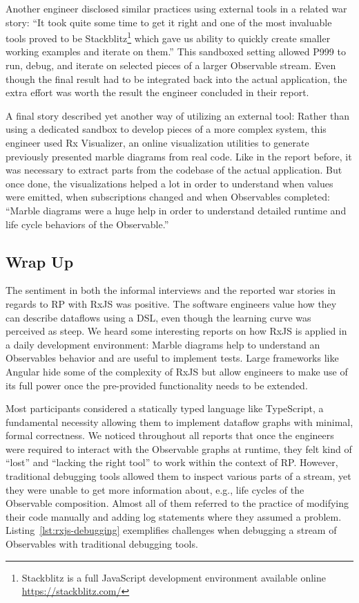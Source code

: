 \documentclass[12pt,a4paper]{article}
\begin{document}
Another engineer disclosed similar practices using external tools in a related war story: ``It took quite some time to get it right and one of the most invaluable tools proved to be Stackblitz\footnote{Stackblitz is a full JavaScript development environment available online \url{https://stackblitz.com/}} which gave us ability to quickly create smaller working examples and iterate on them.'' This sandboxed setting allowed P999 to run, debug, and iterate on selected pieces of a larger Observable stream. Even though the final result had to be integrated back into the actual application, the extra effort was worth the result the engineer concluded in their report.

A final story described yet another way of utilizing an external tool: Rather than using a dedicated sandbox to develop pieces of a more complex system, this engineer used Rx Visualizer, an online visualization utilities to generate previously presented marble diagrams from real code. Like in the report before, it was necessary to extract parts from the codebase of the actual application. But once done, the visualizations helped a lot in order to understand when values were emitted, when subscriptions changed and when Observables completed: ``Marble diagrams were a huge help in order to understand detailed runtime and life cycle behaviors of the Observable.''

\subsection{Wrap Up}

The sentiment in both the informal interviews and the reported war stories in regards to RP with RxJS was positive. The software engineers value how they can describe dataflows using a DSL, even though the learning curve was perceived as steep. We heard some interesting reports on how RxJS is applied in a daily development environment: Marble diagrams help to understand  an Observables behavior and are useful to implement tests. Large frameworks like Angular hide some of the complexity of RxJS but allow engineers to make use of its full power once the pre-provided functionality needs to be extended.

Most participants considered a statically typed language like TypeScript, a fundamental necessity allowing them to implement dataflow graphs with minimal, formal correctness. We noticed throughout all reports that once the engineers were required to interact with the Observable graphs at runtime, they felt kind of ``lost'' and ``lacking the right tool'' to work within the context of RP. However, traditional debugging tools allowed them to inspect various parts of a stream, yet they were unable to get more information about, e.g., life cycles of the Observable composition. Almost all of them referred to the practice of modifying their code manually and adding log statements where they assumed a problem. Listing~\ref{lst:rxjs-debugging} exemplifies challenges when debugging a stream of Observables with traditional debugging tools.
\end{document}
